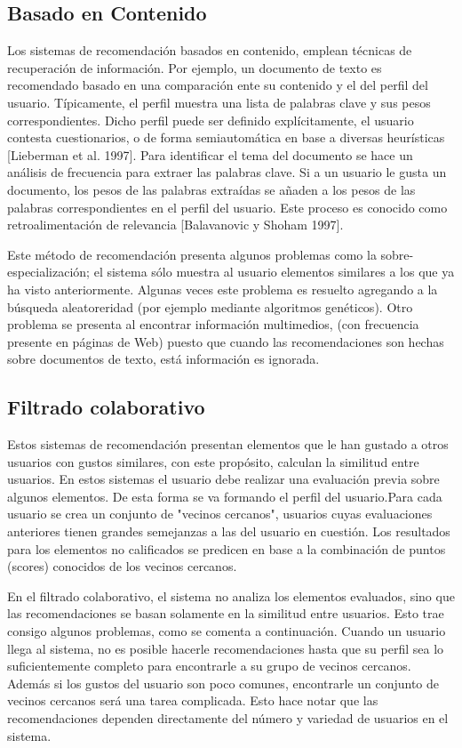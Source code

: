 \subsection{Basado en Contenido}

Los sistemas de recomendación basados en contenido, emplean técnicas de recuperación de información. Por ejemplo, un documento de texto es recomendado basado en una comparación ente su contenido y el del perfil del usuario. Típicamente, el perfil muestra una lista de palabras clave y sus pesos correspondientes. Dicho perfil puede ser definido explícitamente, el usuario contesta cuestionarios, o de forma semiautomática en base a diversas heurísticas [Lieberman et al. 1997]. Para identificar el tema del documento se hace un análisis de frecuencia para extraer las palabras clave. Si a un usuario le gusta un documento, los pesos de las palabras extraídas se añaden a los pesos de las palabras correspondientes en el perfil del usuario. Este proceso es conocido como retroalimentación de relevancia [Balavanovic y Shoham 1997].

Este método de recomendación presenta algunos problemas como la sobre-especialización; el sistema sólo muestra al usuario elementos similares a los que ya ha visto anteriormente. Algunas veces este problema es resuelto agregando a la búsqueda aleatoreridad (por ejemplo mediante algoritmos genéticos). Otro problema se presenta al encontrar información multimedios, (con frecuencia presente en páginas de Web) puesto que cuando las recomendaciones son hechas sobre documentos de texto, está información es ignorada.
\newpage
\subsection{Filtrado colaborativo}
Estos sistemas de recomendación presentan elementos que le han gustado a otros usuarios con gustos similares, con este propósito, calculan la similitud entre usuarios. En estos sistemas el usuario debe realizar una evaluación previa sobre algunos elementos. De esta forma se va formando el perfil del usuario.Para cada usuario se crea un conjunto de "vecinos cercanos", usuarios cuyas evaluaciones anteriores tienen grandes semejanzas a las del usuario en cuestión. Los resultados para los elementos no calificados se predicen en base a la combinación de puntos (scores) conocidos de los vecinos cercanos.


En el filtrado colaborativo, el sistema no analiza los elementos evaluados, sino que las recomendaciones se basan solamente en la similitud entre usuarios. Esto trae consigo algunos problemas, como se comenta a continuación. Cuando un usuario llega al sistema, no es posible hacerle recomendaciones hasta que su perfil sea lo suficientemente completo para encontrarle a su grupo de vecinos cercanos. Además si los gustos del usuario son poco comunes, encontrarle un conjunto de vecinos cercanos será una tarea complicada. Esto hace notar que las recomendaciones dependen directamente del número y variedad de usuarios en el sistema.


